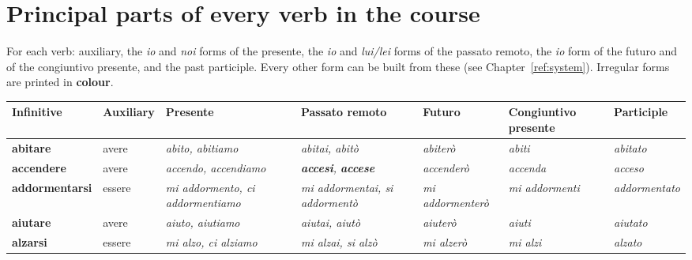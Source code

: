 \documentclass[11pt,a4paper,twoside,openright]{book}
\newcommand{\irr}[1]{{\color{exccol}\bfseries #1}}
\begin{document}
\chapter{Principal parts of every verb in the course}\label{ref:principal}
For each verb: auxiliary, the \textit{io} and \textit{noi} forms of the presente, the \textit{io} and \textit{lui/lei} forms of the passato remoto, the \textit{io} form of the futuro and of the congiuntivo presente, and the past participle. Every other form can be built from these (see Chapter~\ref{ref:system}). Irregular forms are printed in \irr{colour}.\par

{\footnotesize\setlength{\tabcolsep}{3pt}
\begin{xltabular}{\linewidth}{@{}>{\raggedright\arraybackslash}p{2.7cm} l L L l >{\raggedright\arraybackslash}p{1.9cm} l@{}}
\toprule
\textbf{Infinitive} & \textbf{Auxiliary} & \textbf{Presente} & \textbf{Passato remoto} & \textbf{Futuro} & \textbf{Congiuntivo presente} & \textbf{Participle} \\
\midrule
\endhead
\textbf{abitare} & avere & \textit{abito, abitiamo} & \textit{abitai, abitò} & \textit{abiterò} & \textit{abiti} & \textit{abitato} \\
\textbf{accendere} & avere & \textit{accendo, accendiamo} & \textit{\irr{accesi}, \irr{accese}} & \textit{accenderò} & \textit{accenda} & \textit{acceso} \\
\textbf{addormentarsi} & essere & \textit{mi addormento, ci addormentiamo} & \textit{mi addormentai, si addormentò} & \textit{mi addormenterò} & \textit{mi addormenti} & \textit{addormentato} \\
\textbf{aiutare} & avere & \textit{aiuto, aiutiamo} & \textit{aiutai, aiutò} & \textit{aiuterò} & \textit{aiuti} & \textit{aiutato} \\
\textbf{alzarsi} & essere & \textit{mi alzo, ci alziamo} & \textit{mi alzai, si alzò} & \textit{mi alzerò} & \textit{mi alzi} & \textit{alzato} \\

\end{xltabular}}
\end{document}

